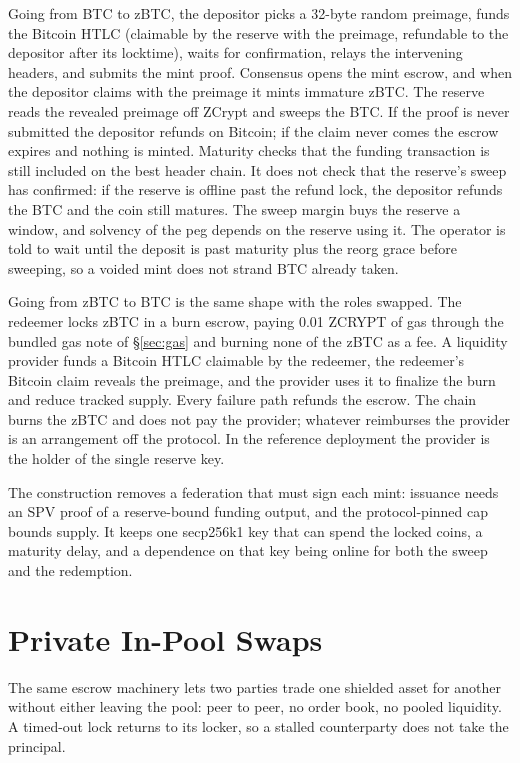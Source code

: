 \documentclass[twocolumn,10pt]{article}
\begin{document}
Going from BTC to zBTC, the depositor picks a 32-byte random preimage, funds the Bitcoin HTLC (claimable by the reserve with the preimage, refundable to the depositor after its locktime), waits for confirmation, relays the intervening headers, and submits the mint proof. Consensus opens the mint escrow, and when the depositor claims with the preimage it mints immature zBTC. The reserve reads the revealed preimage off ZCrypt and sweeps the BTC. If the proof is never submitted the depositor refunds on Bitcoin; if the claim never comes the escrow expires and nothing is minted. Maturity checks that the funding transaction is still included on the best header chain. It does not check that the reserve's sweep has confirmed: if the reserve is offline past the refund lock, the depositor refunds the BTC and the coin still matures. The sweep margin buys the reserve a window, and solvency of the peg depends on the reserve using it. The operator is told to wait until the deposit is past maturity plus the reorg grace before sweeping, so a voided mint does not strand BTC already taken.

Going from zBTC to BTC is the same shape with the roles swapped. The redeemer locks zBTC in a burn escrow, paying 0.01 ZCRYPT of gas through the bundled gas note of \S\ref{sec:gas} and burning none of the zBTC as a fee. A liquidity provider funds a Bitcoin HTLC claimable by the redeemer, the redeemer's Bitcoin claim reveals the preimage, and the provider uses it to finalize the burn and reduce tracked supply. Every failure path refunds the escrow. The chain burns the zBTC and does not pay the provider; whatever reimburses the provider is an arrangement off the protocol. In the reference deployment the provider is the holder of the single reserve key.

The construction removes a federation that must sign each mint: issuance needs an SPV proof of a reserve-bound funding output, and the protocol-pinned cap bounds supply. It keeps one secp256k1 key that can spend the locked coins, a maturity delay, and a dependence on that key being online for both the sweep and the redemption.

\section{Private In-Pool Swaps}
\label{sec:swaps}

The same escrow machinery lets two parties trade one shielded asset for another without either leaving the pool: peer to peer, no order book, no pooled liquidity. A timed-out lock returns to its locker, so a stalled counterparty does not take the principal.
\end{document}
